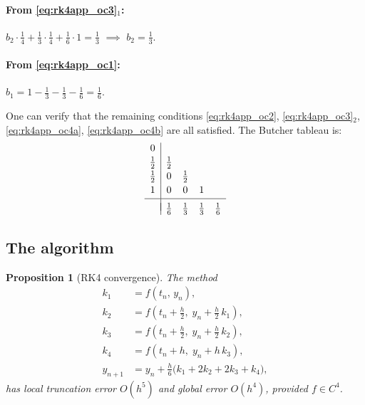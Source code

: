 \documentclass[12pt,a4paper]{article}
\theoremstyle{definition}
\theoremstyle{plain}
\newtheorem{proposition}{Proposition}[section]
\theoremstyle{remark}
\begin{document}
\paragraph{From \eqref{eq:rk4app_oc3}$_1$:} $b_2 \cdot \tfrac{1}{4} + \tfrac{1}{3}\cdot\tfrac{1}{4} + \tfrac{1}{6}\cdot 1 = \tfrac{1}{3}$ $\implies$ $b_2 = \tfrac{1}{3}$.

\paragraph{From \eqref{eq:rk4app_oc1}:} $b_1 = 1 - \tfrac{1}{3} - \tfrac{1}{3} - \tfrac{1}{6} = \tfrac{1}{6}$.

One can verify that the remaining conditions \eqref{eq:rk4app_oc2}, \eqref{eq:rk4app_oc3}$_2$, \eqref{eq:rk4app_oc4a}, \eqref{eq:rk4app_oc4b} are all satisfied. The Butcher tableau is:
\[
  \begin{array}{c|cccc}
    0 \\[2pt]
    \frac{1}{2} & \frac{1}{2} \\[2pt]
    \frac{1}{2} & 0 & \frac{1}{2} \\[2pt]
    1 & 0 & 0 & 1 \\[2pt]
    \hline
    \\[-8pt]
    & \frac{1}{6} & \frac{1}{3} & \frac{1}{3} & \frac{1}{6}
  \end{array}
\]

\subsection{The algorithm}

\begin{proposition}[RK4 convergence]
\label{prop:rk4_convergence}
The method
\begin{align*}
  k_1 &= f(t_n,\, y_n), \\
  k_2 &= f\!\left(t_n + \tfrac{h}{2},\; y_n + \tfrac{h}{2}\,k_1\right), \\
  k_3 &= f\!\left(t_n + \tfrac{h}{2},\; y_n + \tfrac{h}{2}\,k_2\right), \\
  k_4 &= f\!\left(t_n + h,\; y_n + h\,k_3\right), \\[4pt]
  y_{n+1} &= y_n + \tfrac{h}{6}\big(k_1 + 2k_2 + 2k_3 + k_4\big),
\end{align*}
has local truncation error $O(h^5)$ and global error $O(h^4)$, provided $f \in C^4$.
\end{proposition}
\end{document}
